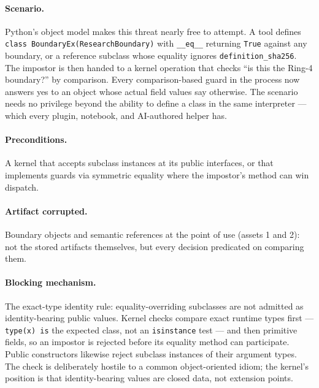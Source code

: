 \paragraph{Scenario.} Python's object model makes this threat nearly free to attempt. A tool defines \texttt{class BoundaryEx(ResearchBoundary)} with \texttt{\_\_eq\_\_} returning \texttt{True} against any boundary, or a reference subclass whose equality ignores \texttt{definition\_sha256}. The impostor is then handed to a kernel operation that checks ``is this the Ring-4 boundary?'' by comparison. Every comparison-based guard in the process now answers yes to an object whose actual field values say otherwise. The scenario needs no privilege beyond the ability to define a class in the same interpreter --- which every plugin, notebook, and AI-authored helper has.

\paragraph{Preconditions.} A kernel that accepts subclass instances at its public interfaces, or that implements guards via symmetric equality where the impostor's method can win dispatch.

\paragraph{Artifact corrupted.} Boundary objects and semantic references at the point of use (assets 1 and 2): not the stored artifacts themselves, but every decision predicated on comparing them.

\paragraph{Blocking mechanism.} The exact-type identity rule: equality-overriding subclasses are not admitted as identity-bearing public values. Kernel checks compare exact runtime types first --- \texttt{type(x) is} the expected class, not an \texttt{isinstance} test --- and then primitive fields, so an impostor is rejected before its equality method can participate. Public constructors likewise reject subclass instances of their argument types. The check is deliberately hostile to a common object-oriented idiom; the kernel's position is that identity-bearing values are closed data, not extension points.

